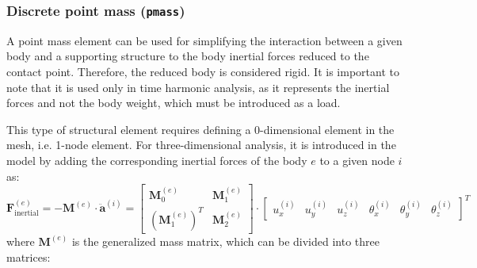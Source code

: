 \documentclass[a4paper,fleqn]{book}
\begin{document}
\subsubsection{Discrete point mass (\texttt{pmass})}

A point mass element can be used for simplifying the interaction between a given body and a supporting structure to the body inertial forces reduced to the contact point. Therefore, the reduced body is considered rigid. It is important to note that it is used only in time harmonic analysis, as it represents the inertial forces and not the body weight, which must be introduced as a load.

This type of structural element requires defining a 0-dimensional element in the mesh, i.e. 1-node element. For three-dimensional analysis, it is introduced in the model by adding the corresponding inertial forces of the body $e$ to a given node $i$ as:
\begin{equation}
\mathbf{F}_\mathrm{inertial}^{(e)}
=
-
\mathbf{M}^{(e)}
\cdot
\ddot{\mathbf{a}}^{(i)}
=
\left[
\begin{array}{cc}
\mathbf{M}_0^{(e)} & \mathbf{M}_1^{(e)} \\
\left(\mathbf{M}_1^{(e)}\right)^T & \mathbf{M}_2^{(e)}
\end{array}
\right]
\cdot
\left[
\begin{array}{cccccc}
u_x^{(i)} & u_y^{(i)} & u_z^{(i)} & \theta_x^{(i)} & \theta_y^{(i)} & \theta_z^{(i)}
\end{array}
\right]^T
\end{equation}
where $\mathbf{M}^{(e)}$ is the generalized mass matrix, which can be divided into three matrices:
\end{document}
